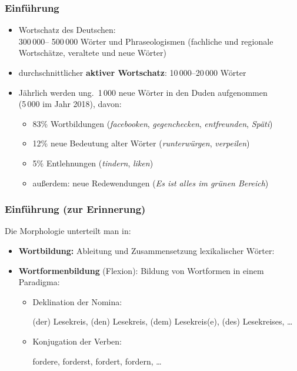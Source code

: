 \begin{frame}
\frametitle{Einführung}

\begin{itemize}
	\item Wortschatz des Deutschen: \\
300\,000– 500\,000 Wörter und Phraseologismen (fachliche und regionale Wortschätze, veraltete und neue Wörter)
	\item durchschnittlicher \textbf{aktiver Wortschatz}:
10\,000–20\,000 Wörter
	\item Jährlich werden ung.\ 1\,000 neue Wörter in den Duden aufgenommen \\
	(5\,000 im Jahr 2018), davon:
	
	\begin{itemize}
		\item 83\% Wortbildungen (\zB \emph{facebooken}, \emph{gegenchecken}, \emph{entfreunden}, \emph{Späti})
		\item 12\% neue Bedeutung alter Wörter (\zB \emph{runterwürgen}, \emph{verpeilen})
		\item 5\% Entlehnungen (\zB \emph{tindern}, \emph{liken})
		\item außerdem: neue Redewendungen (\zB \emph{Es ist alles im grünen Bereich})
	\end{itemize}
\end{itemize}


\end{frame}


\begin{frame}
\frametitle{Einführung (zur Erinnerung)}

Die Morphologie unterteilt man in:
	
	\begin{itemize}
		\item \textbf{Wortbildung:} Ableitung und Zusammensetzung lexikalischer Wörter:
		
		\eal 
		\zl
		
		\item \textbf{Wortformenbildung} (Flexion): Bildung von Wortformen in einem Paradigma: 
		
		\begin{itemize}
			\item Deklination der Nomina: 
			
			\ea (der) Lesekreis, (den) Lesekreis, (dem) Lesekreis(e), (des) Lesekreises, \ldots
			\z 
			
			\item Konjugation der Verben: 
			
			\ea fordere, forderst, fordert, fordern, \ldots 
			\z 
		\end{itemize}	
	\end{itemize}	

\end{frame}


